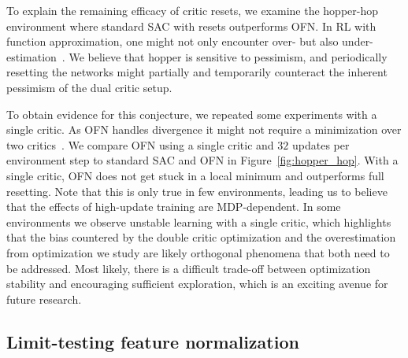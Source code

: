 To explain the remaining efficacy of critic resets, we examine the hopper-hop environment where standard SAC with resets outperforms OFN. 
In RL with function approximation, one might not only encounter over-  but also under-estimation~\parencite{wu2020reducing, lan2020maxmin, saglam2021estimation}.
We believe that hopper  is sensitive to pessimism, and periodically resetting the networks might partially and temporarily counteract the inherent pessimism of the dual critic setup.

To obtain evidence for this conjecture, we repeated some experiments with a single critic. As OFN handles divergence it might not require a minimization over two critics~\parencite{fujimoto2018addressing}. We compare OFN using a single critic and $32$ updates per environment step to standard SAC and OFN in Figure~\ref{fig:hopper_hop}. With a single critic, OFN does not get stuck in a local minimum and outperforms full resetting. Note that this is only true in few environments, leading us to believe that the effects of high-update training are MDP-dependent.
In some environments we observe unstable learning with a single critic, which highlights that the bias countered by the double critic optimization and the overestimation from optimization we study are likely orthogonal phenomena that both need to be addressed.
Most likely, there is a difficult trade-off between optimization stability and encouraging sufficient exploration, which is an exciting avenue for future research.

\subsection{Limit-testing feature normalization}


